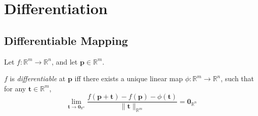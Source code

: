 
\chapter{Differentiation}


\section{Differentiable Mapping}


\begin{definition}
	\label{def: differentiable}
	Let $f: \mathbb R^m \to \mathbb R^n$, and let $\mathbf p \in \mathbb R^m$.
	

	$f$ is \textit{differentiable} at $\mathbf p$ iff there exists a unique linear map $\phi: \mathbb R^m \to \mathbb R^n$, such that for any $\mathbf t \in \mathbb R^m$,
	$$
	\lim_{\mathbf t \to \mathbf 0_{\mathbb R^n}} \frac{f(\mathbf p + \mathbf t) - f(\mathbf p) - \phi(\mathbf t)}{\| \mathbf t \|_{\mathbb R^m}} = \mathbf 0_{\mathbb R^n}
	$$
\end{definition}



